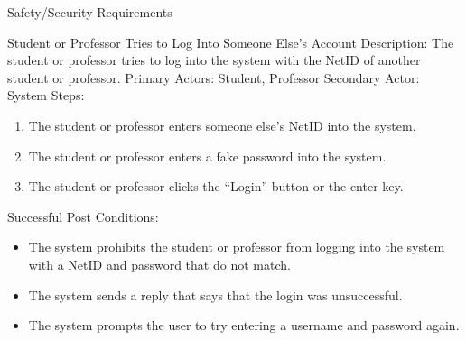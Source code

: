 \documentclass{article}
\begin{document}
\begin{section}{Safety/Security Requirements}
\begin{subsection}{Student or Professor Tries to Log Into Someone Else’s Account}
Description: The student or professor tries to log into the  system with the NetID of another student or professor. \newline
Primary Actors: Student, Professor \newline
Secondary Actor: System \newline
Steps:
\begin{enumerate}
\item{The student or professor enters someone else’s NetID into the system.}
\item{The student or professor enters a fake password into the system.}
\item{The student or professor clicks the “Login” button or the enter key.}
\end{enumerate}
Successful Post Conditions:
\begin{itemize}
\item{The system prohibits the student or professor from logging into the system with a NetID and password that do not match.}
\item{The system sends a reply that says that the login was unsuccessful.}
\item{The system prompts the user to try entering a username and password again.}
\end{itemize}
\end{subsection}

\end{section}
\end{document}
